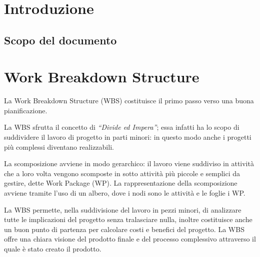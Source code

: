 \newcommand{\sharedPath}{../shared}
\newcommand{\doctitle}{Piano di Progetto}











\section{Introduzione}


\subsection{Scopo del documento}

\clearpage


\section{Work Breakdown Structure}

La Work Breakdown Structure (WBS) costituisce il primo passo verso una buona pianificazione.

La WBS sfrutta il concetto di \textit{``Divide ed Impera''}; essa infatti ha lo scopo di suddividere il lavoro di progetto in parti minori: in questo modo anche i progetti più complessi diventano realizzabili.

La scomposizione avviene in modo gerarchico: il lavoro viene suddiviso in attività che a loro volta vengono scomposte in sotto attività più piccole e semplici da gestire, dette Work Package (WP).
La rappresentazione della scomposizione avviene tramite l'uso di un albero, dove i nodi sono le attività e le foglie i WP.

La WBS permette, nella suddivisione del lavoro in pezzi minori, di analizzare tutte le implicazioni del progetto senza tralasciare nulla, inoltre costituisce anche un buon punto di partenza per calcolare costi e benefici del progetto.
La WBS offre una chiara visione del prodotto finale e del processo complessivo attraverso il quale è stato creato il prodotto.


